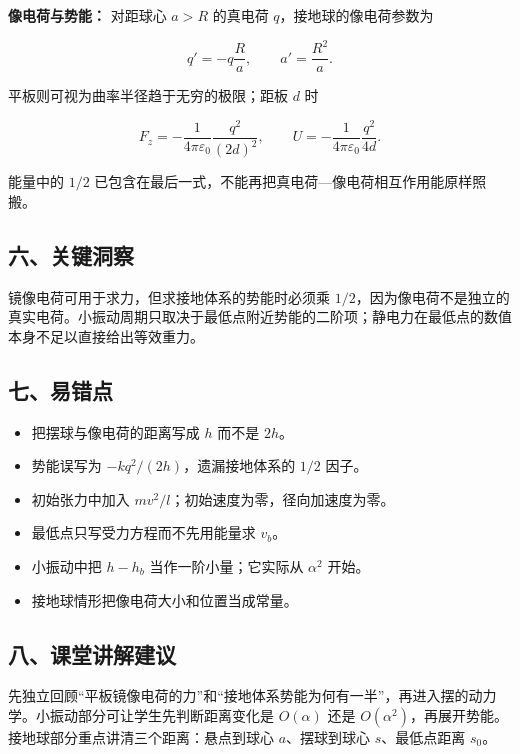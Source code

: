 \documentclass[12pt,a4paper,UTF8]{ctexart}
\newcommand{\tightlist}{\setlength{\itemsep}{0pt}\setlength{\parskip}{0pt}}
\begin{document}
\textbf{像电荷与势能：} 对距球心 \(a>R\) 的真电荷
\(q\)，接地球的像电荷参数为

\[q'=-q\frac Ra,\qquad a'=\frac{R^2}{a}.\]

平板则可视为曲率半径趋于无穷的极限；距板 \(d\) 时

\[F_z=-\frac{1}{4\pi\varepsilon_0}
\frac{q^2}{(2d)^2},\qquad
U=-\frac{1}{4\pi\varepsilon_0}\frac{q^2}{4d}.\]

能量中的 \(1/2\)
已包含在最后一式，不能再把真电荷---像电荷相互作用能原样照搬。

\subsection{六、关键洞察}\label{ux516dux5173ux952eux6d1eux5bdf-2}

镜像电荷可用于求力，但求接地体系的势能时必须乘
\(1/2\)，因为像电荷不是独立的真实电荷。小振动周期只取决于最低点附近势能的二阶项；静电力在最低点的数值本身不足以直接给出等效重力。

\subsection{七、易错点}\label{ux4e03ux6613ux9519ux70b9-2}

\begin{itemize}
\tightlist
\item
  把摆球与像电荷的距离写成 \(h\) 而不是 \(2h\)。
\item
  势能误写为 \(-kq^2/(2h)\)，遗漏接地体系的 \(1/2\) 因子。
\item
  初始张力中加入 \(mv^2/l\)；初始速度为零，径向加速度为零。
\item
  最低点只写受力方程而不先用能量求 \(v_b\)。
\item
  小振动中把 \(h-h_b\) 当作一阶小量；它实际从 \(\alpha^2\) 开始。
\item
  接地球情形把像电荷大小和位置当成常量。
\end{itemize}

\subsection{八、课堂讲解建议}\label{ux516bux8bfeux5802ux8bb2ux89e3ux5efaux8bae-2}

先独立回顾``平板镜像电荷的力''和``接地体系势能为何有一半''，再进入摆的动力学。小振动部分可让学生先判断距离变化是
\(O(\alpha)\) 还是
\(O(\alpha^2)\)，再展开势能。接地球部分重点讲清三个距离：悬点到球心
\(a\)、摆球到球心 \(s\)、最低点距离 \(s_0\)。
\end{document}

